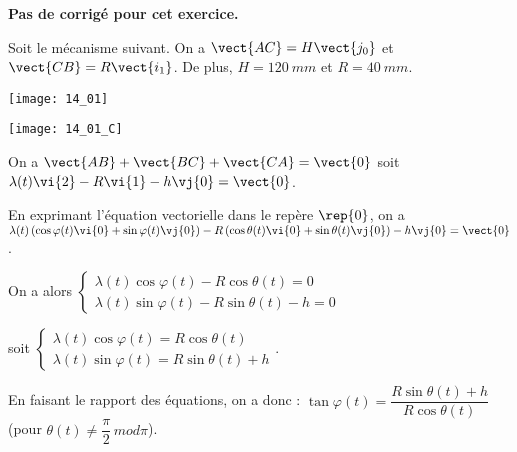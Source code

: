 \normaltrue \difficilefalse \tdifficilefalse
\correctionfalse


\setcounter{numques}{0}
\ifcorrection
\else
\textbf{Pas de corrigé pour cet exercice.}
\fi

\ifprof
\else
Soit le mécanisme suivant. On a $\vect{AC}=H\vect{j_0}$ et $\vect{CB}=R\vect{i_1}$. De plus, 
$H=\SI{120}{mm}$ et $R=\SI{40}{mm}$. 

\begin{center}
\texttt{[image: 14\_01]}
\end{center}
\fi



\begin{center}
\texttt{[image: 14\_01\_C]}
\end{center}
\ifprof
\else
\fi

On a $\vect{AB}+\vect{BC}+\vect{CA}=\vect{0}$ soit 
$\lambda(t)\vi{2}-R\vi{1}-h\vj{0}=\vect{0}$.

En exprimant l'équation vectorielle dans le repère $\rep{0}$, on a 
$\lambda(t)\left( \cos\varphi(t)\vi{0}+\sin\varphi(t)\vj{0}\right)-R\left( \cos\theta(t)\vi{0}+\sin\theta(t)\vj{0}\right)-h\vj{0}=\vect{0}$.

On a alors 
$
\left\{
\begin{array}{l}
\lambda(t)\cos\varphi(t)-R \cos\theta(t)=0 \\
\lambda(t)\sin\varphi(t)-R\sin\theta(t)-h=0
\end{array}
\right.
$

soit 
$
\left\{
\begin{array}{l}
\lambda(t)\cos\varphi(t)=R \cos\theta(t) \\
\lambda(t)\sin\varphi(t)=R\sin\theta(t)+h
\end{array}
\right.
$.

En faisant le rapport des équations, on a donc : $\tan\varphi(t)=\dfrac{R\sin\theta(t)+h}{R \cos\theta(t)}$ (pour $\theta(t)\neq \dfrac{\pi}{2} \, mod \pi$).

\ifprof
\else
\fi


